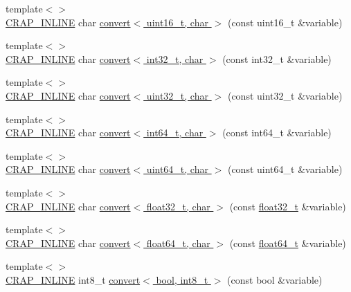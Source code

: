 \begin{DoxyCompactItemize}
{\footnotesize template$<$$>$ }\\\hyperlink{config__x86_8h_a5a40526b8d842e7ff731509998bb0f1c}{C\+R\+A\+P\+\_\+\+I\+N\+L\+I\+N\+E} char \hyperlink{namespacecrap_a95d4413b1479c307600b18bf8db9f464}{convert$<$ uint16\+\_\+t, char $>$} (const uint16\+\_\+t \&variable)
\item 
{\footnotesize template$<$$>$ }\\\hyperlink{config__x86_8h_a5a40526b8d842e7ff731509998bb0f1c}{C\+R\+A\+P\+\_\+\+I\+N\+L\+I\+N\+E} char \hyperlink{namespacecrap_a62d4a03279f4b8d3d362a656cfa033d6}{convert$<$ int32\+\_\+t, char $>$} (const int32\+\_\+t \&variable)
\item 
{\footnotesize template$<$$>$ }\\\hyperlink{config__x86_8h_a5a40526b8d842e7ff731509998bb0f1c}{C\+R\+A\+P\+\_\+\+I\+N\+L\+I\+N\+E} char \hyperlink{namespacecrap_a4d86d0d00baf57ca438bd044822ca603}{convert$<$ uint32\+\_\+t, char $>$} (const uint32\+\_\+t \&variable)
\item 
{\footnotesize template$<$$>$ }\\\hyperlink{config__x86_8h_a5a40526b8d842e7ff731509998bb0f1c}{C\+R\+A\+P\+\_\+\+I\+N\+L\+I\+N\+E} char \hyperlink{namespacecrap_a89adf884d344cf15d3dd055dec226f2b}{convert$<$ int64\+\_\+t, char $>$} (const int64\+\_\+t \&variable)
\item 
{\footnotesize template$<$$>$ }\\\hyperlink{config__x86_8h_a5a40526b8d842e7ff731509998bb0f1c}{C\+R\+A\+P\+\_\+\+I\+N\+L\+I\+N\+E} char \hyperlink{namespacecrap_af085807d92a8c61895e5dd2550986a14}{convert$<$ uint64\+\_\+t, char $>$} (const uint64\+\_\+t \&variable)
\item 
{\footnotesize template$<$$>$ }\\\hyperlink{config__x86_8h_a5a40526b8d842e7ff731509998bb0f1c}{C\+R\+A\+P\+\_\+\+I\+N\+L\+I\+N\+E} char \hyperlink{namespacecrap_a314be432b9d79f6eafcfa30f05e4dcb1}{convert$<$ float32\+\_\+t, char $>$} (const \hyperlink{crap__types_8h_a4611b605e45ab401f02cab15c5e38715}{float32\+\_\+t} \&variable)
\item 
{\footnotesize template$<$$>$ }\\\hyperlink{config__x86_8h_a5a40526b8d842e7ff731509998bb0f1c}{C\+R\+A\+P\+\_\+\+I\+N\+L\+I\+N\+E} char \hyperlink{namespacecrap_a7d9ef15780d792725f0316fac0baa6ee}{convert$<$ float64\+\_\+t, char $>$} (const \hyperlink{crap__types_8h_ac55f3ae81b5bc9053760baacf57e47f4}{float64\+\_\+t} \&variable)
\item 
{\footnotesize template$<$$>$ }\\\hyperlink{config__x86_8h_a5a40526b8d842e7ff731509998bb0f1c}{C\+R\+A\+P\+\_\+\+I\+N\+L\+I\+N\+E} int8\+\_\+t \hyperlink{namespacecrap_a3fea5b7404f5a1ac55e4bed006610f5c}{convert$<$ bool, int8\+\_\+t $>$} (const bool \&variable)

\end{DoxyCompactItemize}
